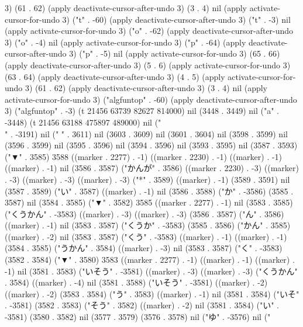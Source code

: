 3) (61 . 62) (apply deactivate-cursor-after-undo 3) (3 . 4) nil (apply activate-cursor-for-undo 3) ("t" . -60) (apply deactivate-cursor-after-undo 3) ("t" . -3) nil (apply activate-cursor-for-undo 3) ("o" . -62) (apply deactivate-cursor-after-undo 3) ("o" . -4) nil (apply activate-cursor-for-undo 3) ("p" . -64) (apply deactivate-cursor-after-undo 3) ("p" . -5) nil (apply activate-cursor-for-undo 3) (65 . 66) (apply deactivate-cursor-after-undo 3) (5 . 6) (apply activate-cursor-for-undo 3) (63 . 64) (apply deactivate-cursor-after-undo 3) (4 . 5) (apply activate-cursor-for-undo 3) (61 . 62) (apply deactivate-cursor-after-undo 3) (3 . 4) nil (apply activate-cursor-for-undo 3) ("algfuntop" . -60) (apply deactivate-cursor-after-undo 3) ("algfuntop" . -3) (t 21456 63739 82627 814000) nil (3448 . 3449) nil ("a" . -3448) (t 21456 63188 475897 489000) nil ("\\" . -3191) nil ("%
" . 3611) nil (3603 . 3609) nil (3601 . 3604) nil (3598 . 3599) nil (3596 . 3599) nil (3595 . 3596) nil (3594 . 3596) nil (3593 . 3595) nil (3587 . 3593) ("▼" . 3585) 3588 ((marker . 2277) . -1) ((marker . 2230) . -1) ((marker) . -1) ((marker) . -1) nil (3586 . 3587) ("かんが" . 3586) ((marker . 2230) . -3) ((marker) . -3) ((marker) . -3) ((marker) . -3) ("*" . 3589) ((marker) . -1) (3589 . 3591) nil (3587 . 3589) ("い" . 3587) ((marker) . -1) nil (3586 . 3588) ("か" . -3586) (3585 . 3587) nil (3584 . 3585) ("▼" . 3582) 3585 ((marker . 2277) . -1) nil (3583 . 3585) ("くうかん" . -3583) ((marker) . -3) ((marker) . -3) (3586 . 3587) ("ん" . 3586) ((marker) . -1) nil (3583 . 3587) ("くうか" . -3583) (3585 . 3586) ("かん" . 3585) ((marker) . -2) nil (3583 . 3587) ("くう" . -3583) ((marker) . -1) ((marker) . -1) (3584 . 3585) ("うかん" . 3584) ((marker) . -3) nil (3583 . 3587) ("く" . -3583) (3582 . 3584) ("▼" . 3580) 3583 ((marker . 2277) . -1) ((marker) . -1) ((marker) . -1) nil (3581 . 3583) ("いそう" . -3581) ((marker) . -3) ((marker) . -3) ("くうかん" . 3584) ((marker) . -4) nil (3581 . 3588) ("いそう" . -3581) ((marker) . -2) ((marker) . -2) (3583 . 3584) ("う" . 3583) ((marker) . -1) nil (3581 . 3584) ("いそ" . -3581) (3582 . 3583) ("そう" . 3582) ((marker) . -2) nil (3581 . 3584) ("い" . -3581) (3580 . 3582) nil (3577 . 3579) (3576 . 3578) nil ("ゆ" . -3576) nil ("
